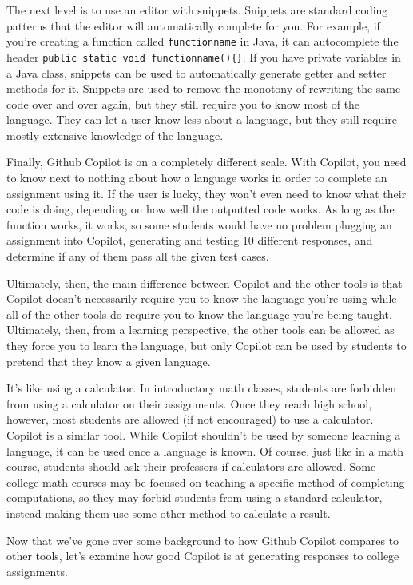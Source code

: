 \documentclass[12pt]{article}
\begin{document}
The next level is to use an editor with snippets. Snippets are standard
coding patterns that the editor will automatically complete for you. For
example, if you're creating a function called \texttt{functionname} in
Java, it can autocomplete the header
\texttt{public\ static\ void\ functionname()\{\}}. If you have private
variables in a Java class, snippets can be used to automatically
generate getter and setter methods for it. Snippets are used to remove
the monotony of rewriting the same code over and over again, but they
still require you to know most of the language. They can let a user know
less about a language, but they still require mostly extensive knowledge
of the language.

Finally, Github Copilot is on a completely different scale. With
Copilot, you need to know next to nothing about how a language works in
order to complete an assignment using it. If the user is lucky, they
won't even need to know what their code is doing, depending on how well
the outputted code works. As long as the function works, it works, so
some students would have no problem plugging an assignment into Copilot,
generating and testing 10 different responses, and determine if any of
them pass all the given test cases.

Ultimately, then, the main difference between Copilot and the other
tools is that Copilot doesn't necessarily require you to know the
language you're using while all of the other tools do require you to
know the language you're being taught. Ultimately, then, from a learning
perspective, the other tools can be allowed as they force you to learn
the language, but only Copilot can be used by students to pretend that
they know a given language.

It's like using a calculator. In introductory math classes, students are
forbidden from using a calculator on their assignments. Once they reach
high school, however, most students are allowed (if not encouraged) to
use a calculator. Copilot is a similar tool. While Copilot shouldn't be
used by someone learning a language, it can be used once a language is
known. Of course, just like in a math course, students should ask their
professors if calculators are allowed. Some college math courses may be
focused on teaching a specific method of completing computations, so
they may forbid students from using a standard calculator, instead
making them use some other method to calculate a result.

Now that we've gone over some background to how Github Copilot compares
to other tools, let's examine how good Copilot is at generating
responses to college assignments.
\end{document}

